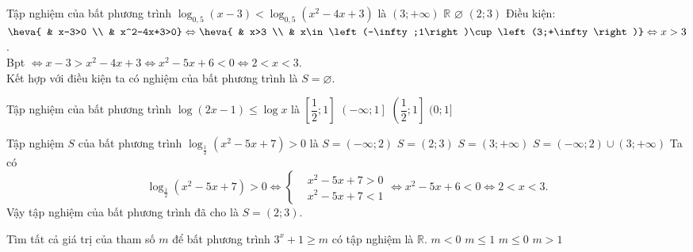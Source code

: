 \begin{ex}%
	Tập nghiệm của bất phương trình $\log_{0{,}5}\left(x-3\right)<\log_{0{,}5}\left(x^2-4x+3\right)$ là
	\choice
	{$\left(3;+\infty \right)$}
	{$\mathbb{R}$}
	{\True $\varnothing $}
	{$\left(2;3\right)$}
	\loigiai
	{
		Điều kiện: $\heva{
			& x-3>0 \\ 
			& x^2-4x+3>0}\Leftrightarrow \heva{
			& x>3 \\ 
			& x\in \left(-\infty;1\right)\cup \left(3;+\infty \right)}\Leftrightarrow x>3$. \\
		Bpt $\Leftrightarrow x-3>x^2-4x+3\Leftrightarrow x^2-5x+6<0\Leftrightarrow 2<x<3$. \\
		Kết hợp với điều kiện ta có nghiệm của bất phương trình là $S=\varnothing$.
	}
\end{ex}


\begin{ex}%
	Tập nghiệm của bất phương trình $\log(2x-1)\le \log x$ là
	\choice
	{$\left[\dfrac{1}{2};1\right]$}
	{$\left(-\infty;1\right]$}
	{\True $\left(\dfrac{1}{2};1\right]$}
	{$(0;1]$}
	\loigiai{
		$\log(2x-1)\le \log x$ $\Leftrightarrow 0<2x-1\le x$ $\Leftrightarrow \dfrac{1}{2}<x\le 1$.\\
		Vậy tập nghiệm của bất phương trình là $\left(\dfrac{1}{2};1\right]$
	}
\end{ex}

\begin{ex}%
	Tập nghiệm $S$ của bất phương trình $\log_{\frac{1}{2}} (x^2-5x+7)>0$ là
	\choice
	{$S=(-\infty;2)$}
	{\True $S=(2;3)$}
	{$S=(3;+\infty)$}
	{$S=(-\infty;2)\cup (3;+\infty)$}
	\loigiai
	{
		Ta có
		\[\log_{\frac{1}{2}} (x^2-5x+7)>0 \Leftrightarrow \left\{\begin{aligned}&x^2-5x+7>0 \\&x^2-5x+7<1\end{aligned}\right. \Leftrightarrow x^2-5x+6<0 \Leftrightarrow 2<x<3.\]
		Vậy tập nghiệm của bất phương trình đã cho là $S=(2;3)$.
	}
\end{ex}

\begin{ex} Tìm tất cả giá trị của tham số $m$ để bất phương trình $3^x+1 \ge m$ có tập nghiệm là $\mathbb{R}$.
	\choice
	{$m<0$}
	{\True $m \le 1$ }
	{$m \le 0$}
	{$m>1$}
\end{ex}


